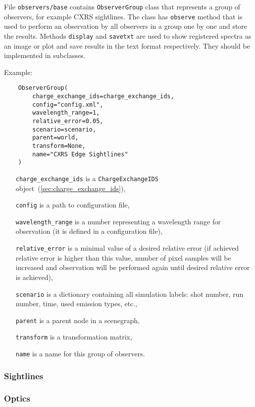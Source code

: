 \documentclass[../main.tex]{subfiles}
\begin{document}
File \texttt{observers/base} contains \texttt{ObserverGroup} class that represents a group of observers, for example CXRS sightlines. The class has \texttt{observe} method that is used to perform an observation by all observers in a group one by one and store the results. Methods \texttt{display} and \texttt{savetxt} are used to show registered spectra as an image or plot and save results in the text format respectively. They should be implemented in subclasses.

Example:
\begin{verbatim}
    ObserverGroup(
        charge_exchange_ids=charge_exchange_ids,
        config="config.xml",
        wavelength_range=1,
        relative_error=0.05,
        scenario=scenario,
        parent=world,
        transform=None,
        name="CXRS Edge Sightlines"
    )
\end{verbatim}

\begin{itemize}[align=left]
    \item[\texttt{charge\_exchange\_ids}] is a \texttt{ChargeExchangeIDS} object~(\cref{sec:charge_exchange_ids}),
    \item[\texttt{config}] is a path to configuration file,
    \item[\texttt{wavelength\_range}] is a number representing a wavelength range for observation (it is defined in a configuration file),
    \item[\texttt{relative\_error}] is a minimal value of a desired relative error (if achieved relative error is higher than this value, number of pixel samples will be increased and observation will be performed again until desired relative error is achieved),
    \item[\texttt{scenario}] is a dictionary containing all simulation labels: shot number, run number, time, used emission types, etc.,
    \item[\texttt{parent}] is a parent node in a scenegraph,
    \item[\texttt{transform}] is a transformation matrix,
    \item[\texttt{name}] is a name for this group of observers.
\end{itemize}

\subsubsection{Sightlines}%
\label{sec:sightlines}

\subsubsection{Optics}
\end{document}
